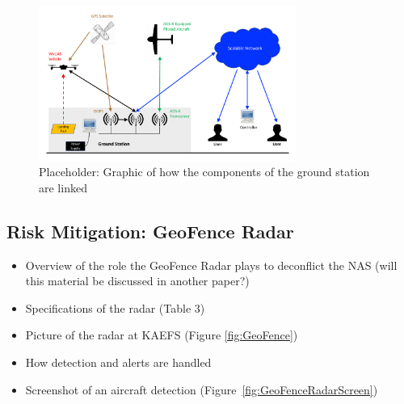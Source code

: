 \documentclass[sensors,review,submit,moreauthors,pdftex,10pt,a4paper]{mdpi}
\theoremstyle{mdpi}
\newcounter{ex}
\newcounter{re}
\theoremstyle{mdpidefinition}
\begin{document}
\begin{figure}
\centering
\includegraphics[angle=0, width=0.75\textwidth]{figures/ConOps.pdf}
\caption{\label{fig:GroundStation} Placeholder: Graphic of how the components of the ground station are linked}
\end{figure}

\subsection{Risk Mitigation: GeoFence Radar}
\begin{itemize}[leftmargin=*,labelsep=4mm]
\color{blue}
\item	Overview of the role the GeoFence Radar plays to deconflict the NAS (will this material be discussed in another paper?)
\item	Specifications of the radar (Table 3)
\item	Picture of the radar at KAEFS (Figure \ref{fig:GeoFence})
\item	How detection and alerts are handled
\item	Screenshot of an aircraft detection (Figure~\ref{fig:GeoFenceRadarScreen})
\end{itemize}
\end{document}
